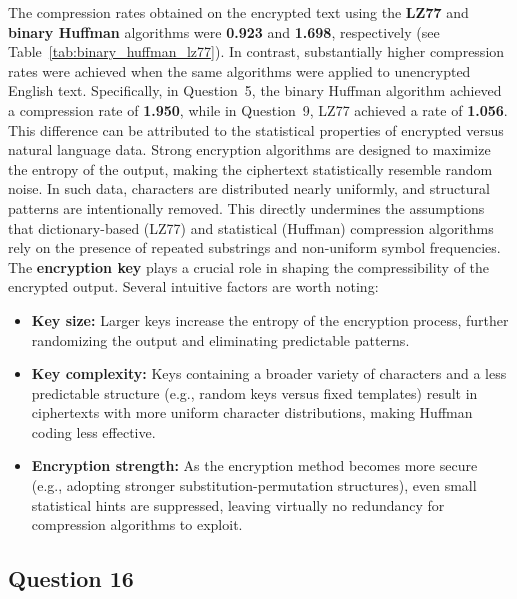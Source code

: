 \documentclass[]{template}
\begin{document}
    The compression rates obtained on the encrypted text using the \textbf{LZ77} and 
    \textbf{binary Huffman} algorithms were \textbf{0.923} and \textbf{1.698}, 
    respectively (see Table~\ref{tab:binary_huffman_lz77}). 
    In contrast, substantially higher compression rates were achieved when the same algorithms 
    were applied to unencrypted English text. 
    Specifically, in Question~5, the binary Huffman algorithm achieved a compression rate of 
    \textbf{1.950}, while in Question~9, LZ77 achieved a rate of \textbf{1.056}.\\

    \noindent
    This difference can be attributed to the statistical properties of encrypted versus natural 
    language data. Strong encryption algorithms are designed to maximize the entropy of the output, 
    making the ciphertext statistically resemble random noise. In such data, characters are distributed 
    nearly uniformly, and structural patterns are intentionally removed. This directly undermines the 
    assumptions that dictionary-based (LZ77) and statistical (Huffman) compression algorithms rely on
    the presence of repeated substrings and non-uniform symbol frequencies.\\

    \noindent
    The \textbf{encryption key} plays a crucial role in shaping the compressibility of the encrypted output. 
    Several intuitive factors are worth noting:

    \begin{itemize}
        \item \textbf{Key size:} Larger keys increase the entropy of the encryption process, further randomizing the output and eliminating predictable patterns.
        \item \textbf{Key complexity:} Keys containing a broader variety of characters and a less predictable structure (e.g., random keys versus fixed templates) result in ciphertexts with more uniform character distributions, making Huffman coding less effective.
        \item \textbf{Encryption strength:} As the encryption method becomes more secure (e.g., adopting stronger substitution-permutation structures), even small statistical hints are suppressed, leaving virtually no redundancy for compression algorithms to exploit.
    \end{itemize}

    \subsection{Question 16}
\end{document}
